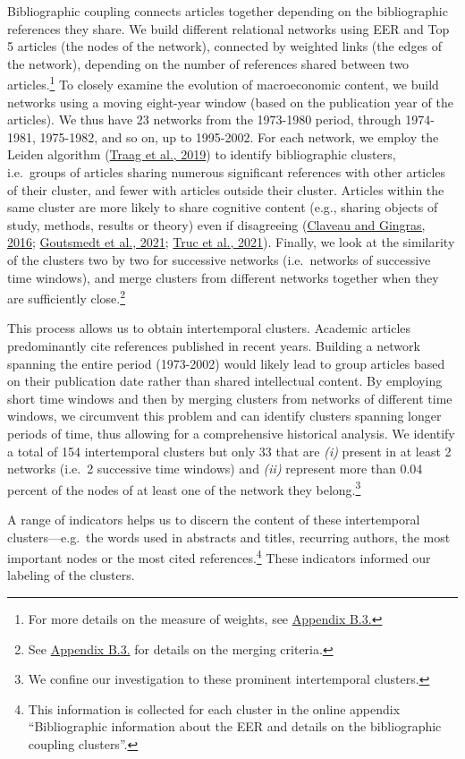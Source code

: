 \documentclass[
  12pt,
  onecolumn]{article}
\begin{document}
Bibliographic coupling connects articles together depending on the bibliographic references they share. We build different relational networks using EER and Top 5 articles (the nodes of the network), connected by weighted links (the edges of the network), depending on the number of references shared between two articles.\footnote{For more details on the measure of weights, see \protect\hyperlink{network}{Appendix B.3.}} To closely examine the evolution of macroeconomic content, we build networks using a moving eight-year window (based on the publication year of the articles). We thus have 23 networks from the 1973-1980 period, through 1974-1981, 1975-1982, and so on, up to 1995-2002. For each network, we employ the Leiden algorithm (\protect\hyperlink{ref-traag2019}{Traag et al., 2019}) to identify bibliographic clusters, i.e.~groups of articles sharing numerous significant references with other articles of their cluster, and fewer with articles outside their cluster. Articles within the same cluster are more likely to share cognitive content (e.g., sharing objects of study, methods, results or theory) even if disagreeing (\protect\hyperlink{ref-claveau2016}{Claveau and Gingras, 2016}; \protect\hyperlink{ref-goutsmedt2021}{Goutsmedt et al., 2021}; \protect\hyperlink{ref-truc2021}{Truc et al., 2021}). Finally, we look at the similarity of the clusters two by two for successive networks (i.e.~networks of successive time windows), and merge clusters from different networks together when they are sufficiently close.\footnote{See \protect\hyperlink{network}{Appendix B.3.} for details on the merging criteria.}

This process allows us to obtain intertemporal clusters. Academic articles predominantly cite references published in recent years. Building a network spanning the entire period (1973-2002) would likely lead to group articles based on their publication date rather than shared intellectual content. By employing short time windows and then by merging clusters from networks of different time windows, we circumvent this problem and can identify clusters spanning longer periods of time, thus allowing for a comprehensive historical analysis. We identify a total of 154 intertemporal clusters but only 33 that are \emph{(i)} present in at least 2 networks (i.e.~2 successive time windows) and \emph{(ii)} represent more than 0.04 percent of the nodes of at least one of the network they belong.\footnote{We confine our investigation to these prominent intertemporal clusters.}

A range of indicators helps us to discern the content of these intertemporal clusters---e.g.~the words used in abstracts and titles, recurring authors, the most important nodes or the most cited references.\footnote{This information is collected for each cluster in the online appendix ``Bibliographic information about the EER and details on the bibliographic coupling clusters''.} These indicators informed our labeling of the clusters.
\end{document}
